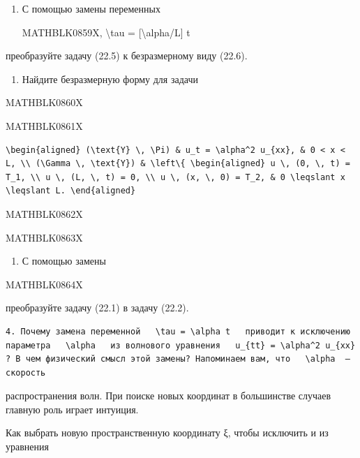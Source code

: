 \documentclass[
]{article}
\providecommand{\tightlist}{%
  \setlength{\itemsep}{0pt}\setlength{\parskip}{0pt}}
\begin{document}
\begin{enumerate}
\def\labelenumi{\arabic{enumi}.}
\item
  С помощью замены переменных

  MATHBLK0859X, \textbackslash tau = {[}\textbackslash alpha/L{]} t
\end{enumerate}

преобразуйте задачу (22.5) к безразмерному виду (22.6).

\begin{enumerate}
\def\labelenumi{\arabic{enumi}.}
\setcounter{enumi}{1}
\tightlist
\item
  Найдите безразмерную форму для задачи
\end{enumerate}

MATHBLK0860X

MATHBLK0861X

\begin{verbatim}
\begin{aligned} (\text{Y} \, \Pi) & u_t = \alpha^2 u_{xx}, & 0 < x < L, \\ (\Gamma \, \text{Y}) & \left\{ \begin{aligned} u \, (0, \, t) = T_1, \\ u \, (L, \, t) = 0, \\ u \, (x, \, 0) = T_2, & 0 \leqslant x \leqslant L. \end{aligned}
\end{verbatim}

MATHBLK0862X

MATHBLK0863X

\begin{enumerate}
\def\labelenumi{\arabic{enumi}.}
\setcounter{enumi}{2}
\tightlist
\item
  С помощью замены
\end{enumerate}

MATHBLK0864X

преобразуйте задачу (22.1) в задачу (22.2).

\begin{verbatim}
4. Почему замена переменной   \tau = \alpha t   приводит к исключению параметра   \alpha   из волнового уравнения   u_{tt} = \alpha^2 u_{xx}  ? В чем физический смысл этой замены? Напоминаем вам, что   \alpha  —скорость
\end{verbatim}

распространения волн. При поиске новых координат в большинстве случаев
главную роль играет интуиция.

Как выбрать новую пространственную координату ξ, чтобы исключить и из
уравнения
\end{document}
